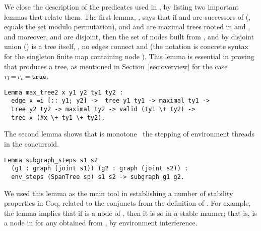 We close the description of the predicates used in , by
listing two important lemmas that relate them. The first lemma,
%
, says that if  and  are
successors of  (\ie,  equals the set \code{[::
  y1; y2]} %
modulo permutation), and  and  are maximal trees
rooted in  and , and moreover,  and
 are disjoint, then the set of nodes built from ,
 and  by disjoint union (\code{\\+}) is a tree
itself, \ie, no edges connect  and  (the notation
 is concrete syntax for the singleton finite map containing
node ).  This lemma is essential in proving that 
produces a tree, as mentioned in Section~\ref{sec:overview} for the
case $r_l\,{=}\,r_r\,{=}\,\mathtt{\small{true}}$.
%
%
\begin{lstlisting}
Lemma max_tree2 x y1 y2 ty1 ty2 : 
  edge x =i [:: y1; y2] ->  tree y1 ty1 -> maximal ty1 ->
  tree y2 ty2 -> maximal ty2 -> valid (ty1 \+ ty2) -> 
  tree x (#x \+ ty1 \+ ty2).
\end{lstlisting}
The second lemma shows that  is monotone \wrt~the
stepping of environment threads in the  concurroid.
%
\begin{lstlisting}
Lemma subgraph_steps s1 s2
  (g1 : graph (joint s1)) (g2 : graph (joint s2)) :
  env_steps (SpanTree sp) s1 s2 -> subgraph g1 g2.
\end{lstlisting}
We used this lemma as the main tool in establishing a number of
stability properties in Coq, related to the conjuncts from the
definition of . For example, the lemma implies
that if  is a node of , then it is so in a
stable manner; that is,  is a node in  for any
 obtained from , by environment interference.



